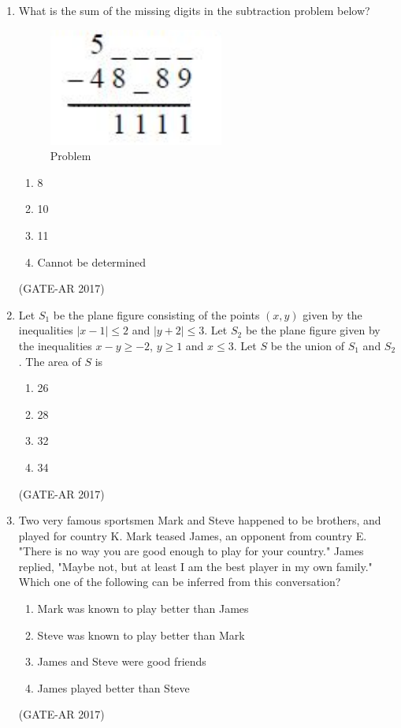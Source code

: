 \documentclass[a4paper,10pt]{article}
\begin{document}
\begin{enumerate}
    \item What is the sum of the missing digits in the subtraction problem below? \\
    \begin{figure}[h!]
        \centering
        \includegraphics[width=0.3\columnwidth]{figs/04.jpg}
        \caption{Problem}
	\label{fig:Img04}
	\end{figure}
    \begin{multicols}{4}
	\begin{enumerate}
        \item 8
        \item 10
        \item 11
        \item Cannot be determined
    \end{enumerate}
	\end{multicols}
    \hfill (GATE-AR 2017)

    \item Let $S_1$ be the plane figure consisting of the points $(x, y)$ given by the inequalities $|x - 1| \leq 2$ and $|y + 2| \leq 3$. Let $S_2$ be the plane figure given by the inequalities $x - y \geq -2$, $y \geq 1$ and $x \leq 3$. Let $S$ be the union of $S_1$ and $S_2$. The area of $S$ is 
    \begin{multicols}{4}
	\begin{enumerate}
        \item 26
        \item 28
        \item 32
        \item 34
    \end{enumerate}
	\end{multicols}
    \hfill (GATE-AR 2017)

    \item Two very famous sportsmen Mark and Steve happened to be brothers, and played for country K. Mark teased James, an opponent from country E. "There is no way you are good enough to play for your country." James replied, "Maybe not, but at least I am the best player in my own family." \\
    Which one of the following can be inferred from this conversation?
    \begin{enumerate}
        \item Mark was known to play better than James
        \item Steve was known to play better than Mark
        \item James and Steve were good friends
        \item James played better than Steve
    \end{enumerate}
    \hfill (GATE-AR 2017)


\end{enumerate}
\end{document}
